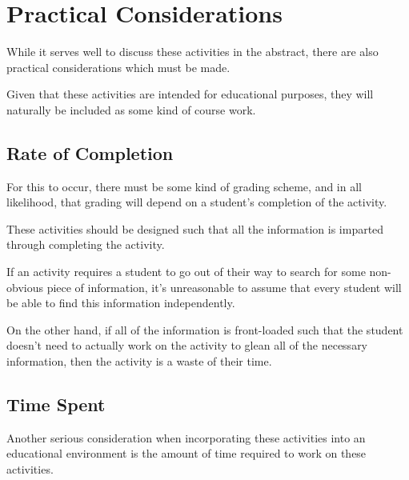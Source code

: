 \section{Practical Considerations}



    While it serves well to discuss these activities in the abstract, there are also practical considerations which must be made. %



Given that these activities are intended for educational purposes, they will naturally be included as some kind of course work.







    \subsection{Rate of Completion}



         For this to occur, there must be some kind of grading scheme, and in all likelihood, that grading will depend on a student's completion of the activity. %



These activities should be designed such that all the information is imparted through completing the activity. %



If an activity requires a student to go out of their way to search for some non-obvious piece of information, it's unreasonable to assume that every student will be able to find this information independently. %



On the other hand, if all of the information is front-loaded such that the student doesn't need to actually work on the activity to glean all of the necessary information, then the activity is a waste of their time. 







        



    \subsection{Time Spent}



        Another serious consideration when incorporating these activities into an educational environment is the amount of time required to work on these activities. %



